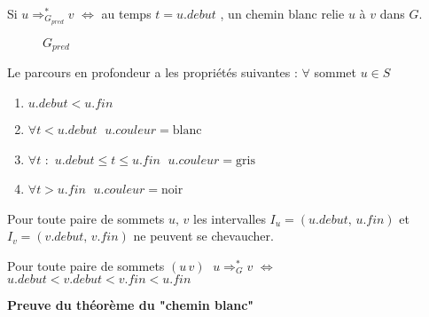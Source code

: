 \begin{theorem}
Si $u \Rightarrow_{G_{pred}}^{\ast} v$ $\Leftrightarrow$ au temps $t = u.debut$ , un chemin blanc relie $u$ à $v$ dans $G$.
\end{theorem}

\newpage

\begin{figure}[h]
	\centering
	\caption{$G_{pred}$}
\end{figure}

\begin{proposition}\label{prop:dfs_graph_p1}
Le parcours en profondeur a les propriétés suivantes : $\forall$ sommet $u \in S$

\begin{enumerate}
\item $u.debut < u.fin$
\item $\forall t < u.debut$ $\; u.couleur = \text{blanc}$
\item $\forall t$ : $\, u.debut \leq t \leq u.fin$ $\;u.couleur = \text{gris}$
\item $\forall t > u.fin$ $\; u.couleur = \text{noir}$
\end{enumerate}
\end{proposition}


\begin{proposition}\label{prop:dfs_graph_p2}
Pour toute paire de sommets $u,\, v$ les intervalles $I_{u} = (u.debut,\, u.fin)$ et $I_{v} = (v.debut,\, v.fin)$ ne peuvent se chevaucher.
\end{proposition}

\begin{proposition}\label{prop:dfs_graph_p3}
Pour toute paire de sommets $(u\, v)$ $\;u \Rightarrow_{G}^{\ast} v$ $\Leftrightarrow$ $u.debut < v.debut < v.fin < u.fin$
\end{proposition}

\textbf{\sffamily\small Preuve du théorème du "chemin blanc"}

